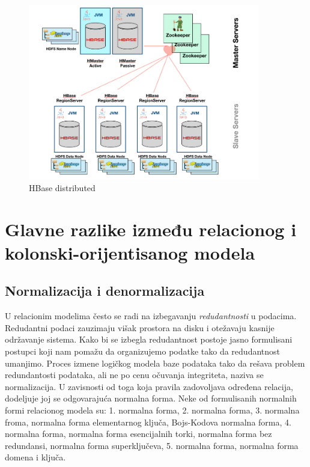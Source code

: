 \documentclass[12pt,oneside]{memoir}
\begin{document}
\begin{figure}[!ht]
  \centering
  \includegraphics[width=0.9\textwidth]{hbase-distributed.png}
  \caption{HBase distributed}
  \label{fig:grafikon}
\end{figure}


\pagebreak

\section{Glavne razlike između relacionog i kolonski-orijentisanog modela}


\subsection{Normalizacija i denormalizacija}

U relacionim modelima često se radi na izbegavanju \textit{redudantnosti} u podacima. Redudantni podaci zauzimaju višak prostora na disku i otežavaju kasnije održavanje sistema. Kako bi se izbegla redudantnost postoje jasno formulisani postupci koji nam pomažu da organizujemo podatke tako da redudantnost umanjimo. Proces izmene logičkog modela baze podataka tako da rešava problem redundantosti podataka, ali ne po cenu očuvanja integriteta, naziva se normalizacija. U zavisnosti od toga koja pravila zadovoljava određena relacija, dodeljuje joj se odgovarajuća normalna forma. Neke od formulisanih normalnih formi relacionog modela su: 1. normalna forma, 2. normalna forma, 3. normalna froma, normalna forma elementarnog ključa, Bojs-Kodova normalna forma, 4. normalna forma, normalna forma esencijalnih torki, normalna forma bez redundansi, normalna forma superključeva, 5. normalna forma, normalna forma domena i ključa.
\end{document}
